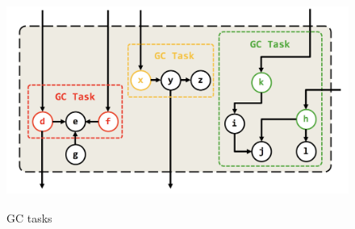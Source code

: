 \begin{figure}[H]
    \centering
    \includegraphics[width=12cm,height=7cm]{figure/n2.jpeg}
    \caption{
        GC tasks
    }
    \label{snapshot}
\end{figure}


